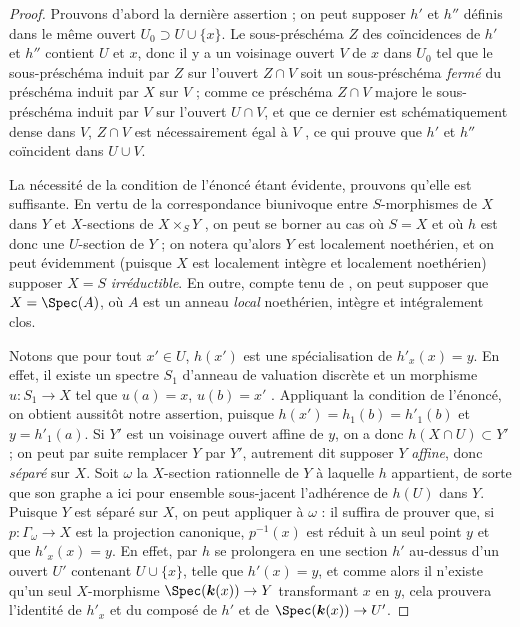 \begin{proof}
Prouvons d'abord la dernière assertion ; on peut supposer $h'$ et $h''$ définis dans le même ouvert $U_0\supset U\cup\{x\}$.
Le sous-préschéma $Z$ des coïncidences de $h'$ et $h''$  contient $U$ et $x$, donc il y a un voisinage ouvert $V$ de $x$ dans $U_0$ tel que le sous-préschéma induit par $Z$ sur l'ouvert $Z\cap V$ soit un sous-préschéma \emph{fermé} du préschéma induit par $X$ sur $V$ ; comme ce préschéma $Z\cap V$ majore le sous-préschéma induit par $V$ sur l'ouvert $U\cap V$, et que ce dernier est schématiquement dense dans $V$, $Z\cap V$ est nécessairement égal à $V$ , ce qui prouve que $h'$ et $h''$ coïncident dans $U\cup V$.

La nécessité de la condition de l'énoncé étant évidente, prouvons qu'elle est suffisante.
En vertu de la correspondance biunivoque entre $S$-morphismes de $X$ dans $Y$ et $X$-sections de $X\times_S Y$ , on peut se borner au cas où $S=X$ et où $h$ est donc une $U$-section de $Y$ ; on notera qu'alors $Y$ est localement noethérien, et on peut évidemment (puisque $X$ est localement intègre et localement noethérien) supposer $X=S$ \emph{irréductible}.
En outre, compte tenu de , on peut supposer que $X=\Spec(A)$, où $A$ est un anneau \emph{local} noethérien, intègre et intégralement clos.

Notons que pour tout $x'\in U$, $h(x')$ est une spécialisation de $h'_x(x)=y$.
En effet, il existe un spectre $S_1$ d'anneau de valuation discrète et un morphisme $u:S_1\to X$ tel que $u(a)=x$, $u(b)=x'$ .
Appliquant la condition de l'énoncé, on obtient aussitôt notre assertion, puisque $h(x')=h_1(b)=h'_1(b)$ et $y=h'_1(a)$.
Si $Y'$ est un voisinage ouvert affine de $y$, on a donc $h(X\cap U)\subset Y'$ ; on peut par suite remplacer $Y$ par $Y'$, autrement dit supposer $Y$ \emph{affine}, donc \emph{séparé} sur $X$.
Soit $\omega$ la $X$-section rationnelle de $Y$ à laquelle $h$ appartient, de sorte que son graphe a ici pour ensemble sous-jacent l'adhérence de $h(U)$ dans $Y$.
Puisque $Y$ est séparé sur $X$, on peut appliquer  à $\omega$ : il suffira de prouver que, si $p:\Gamma_\omega\to X$ est la projection canonique, $p^{-1}(x)$ est réduit à un seul point $y$ et que $h'_x(x)=y$.
En effet, par  $h$ se prolongera en une section $h'$ au-dessus d'un ouvert $U'$ contenant $U\cup\{x\}$, telle que $h'(x)=y$, et comme alors il n'existe qu'un seul $X$-morphisme $\Spec(\boldsymbol{k}(x))\to Y$ transformant $x$ en $y$, cela prouvera l'identité de $h'_x$ et du composé de $h'$ et de $\Spec(\boldsymbol{k}(x))\to U'$.


\end{proof}
